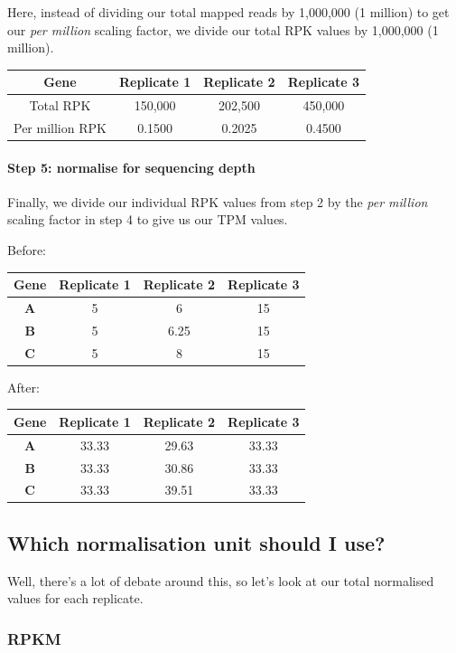 \documentclass[11pt]{article}
\begin{document}
Here, instead of dividing our total mapped reads by 1,000,000 (1
million) to get our \textit{per million} scaling factor, we divide our
total RPK values by 1,000,000 (1 million).

\begin{longtable}[]{@{}cccc@{}}
\toprule
Gene & Replicate 1 & Replicate 2 & Replicate 3\tabularnewline
\midrule
\endhead
Total RPK & 150,000 & 202,500 & 450,000\tabularnewline
Per million RPK & 0.1500 & 0.2025 & 0.4500\tabularnewline
\bottomrule
\end{longtable}

\newpage

\hypertarget{step-5-normalise-for-sequencing-depth}{%
\paragraph{Step 5: normalise for sequencing
depth}\label{step-5-normalise-for-sequencing-depth}}

Finally, we divide our individual RPK values from step 2 by the
\textit{per million} scaling factor in step 4 to give us our TPM values.

Before:

\begin{longtable}[]{@{}cccc@{}}
\toprule
Gene & Replicate 1 & Replicate 2 & Replicate 3\tabularnewline
\midrule
\endhead
\textbf{A} & 5 & 6 & 15\tabularnewline
\textbf{B} & 5 & 6.25 & 15\tabularnewline
\textbf{C} & 5 & 8 & 15\tabularnewline
\bottomrule
\end{longtable}

After:

\begin{longtable}[]{@{}cccc@{}}
\toprule
Gene & Replicate 1 & Replicate 2 & Replicate 3\tabularnewline
\midrule
\endhead
\textbf{A} & 33.33 & 29.63 & 33.33\tabularnewline
\textbf{B} & 33.33 & 30.86 & 33.33\tabularnewline
\textbf{C} & 33.33 & 39.51 & 33.33\tabularnewline
\bottomrule
\end{longtable}

    \hypertarget{which-normalisation-unit-should-i-use}{%
\subsection{Which normalisation unit should I
use?}\label{which-normalisation-unit-should-i-use}}

Well, there's a lot of debate around this, so let's look at our total
normalised values for each replicate.

\hypertarget{rpkm}{%
\subsubsection{RPKM}\label{rpkm}}
\end{document}
